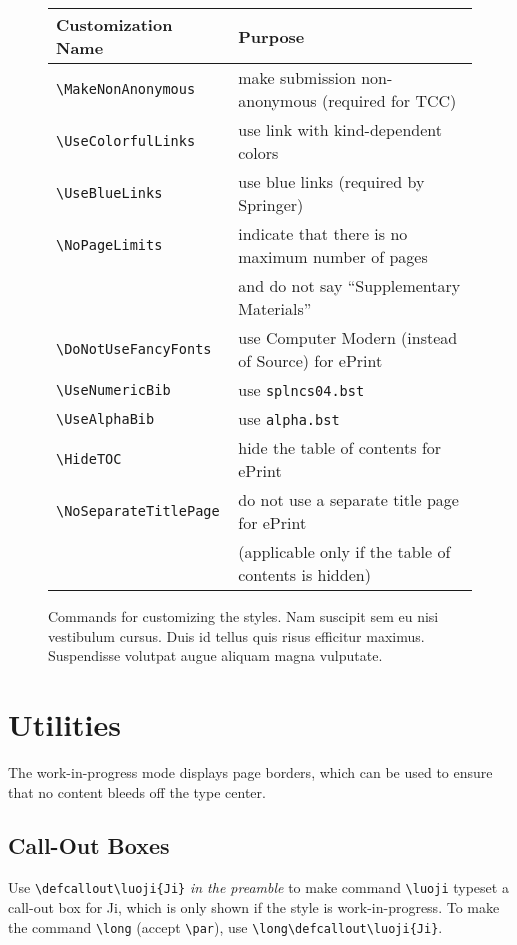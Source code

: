 \begin{figure}[h]
\centering
\begin{tabular}{ll}
\toprule
Customization Name & Purpose \\
\midrule
\texttt{\textbackslash MakeNonAnonymous} &
make submission non-anonymous (required for TCC) \\
\texttt{\textbackslash UseColorfulLinks} &
use link with kind-dependent colors \\
\texttt{\textbackslash UseBlueLinks} &
use blue links (required by Springer) \\
\texttt{\textbackslash NoPageLimits} &
indicate that there is no maximum number of pages \\
& \quad and do not say ``Supplementary Materials'' \\
\texttt{\textbackslash DoNotUseFancyFonts} &
use Computer Modern (instead of Source) for ePrint \\
\texttt{\textbackslash UseNumericBib} &
use \texttt{splncs04.bst} \\
\texttt{\textbackslash UseAlphaBib} &
use \texttt{alpha.bst} \\
\texttt{\textbackslash HideTOC} &
hide the table of contents for ePrint \\
\texttt{\textbackslash NoSeparateTitlePage} &
do not use a separate title page for ePrint \\
& \quad (applicable only if the table of contents is hidden) \\
\bottomrule
\end{tabular}
\caption{Commands for customizing the styles.
Nam suscipit sem eu nisi vestibulum cursus.
Duis id tellus quis risus efficitur maximus.
Suspendisse volutpat augue aliquam magna vulputate.}
\label{fig:figure1}
\end{figure}

\section{Utilities}

The work-in-progress mode displays page borders,
which can be used to ensure that no content bleeds off the type center.

\subsection{Call-Out Boxes}

Use
\texttt{\textbackslash defcallout\textbackslash luoji\{Ji\}}
\emph{in the preamble}
to make
command \texttt{\textbackslash luoji} typeset a call-out box for Ji,
which is only shown if the style is work-in-progress.
To make the command
\texttt{\textbackslash long} (accept \texttt{\textbackslash par}),
use
\texttt{\textbackslash long\textbackslash defcallout\textbackslash luoji\{Ji\}}.

